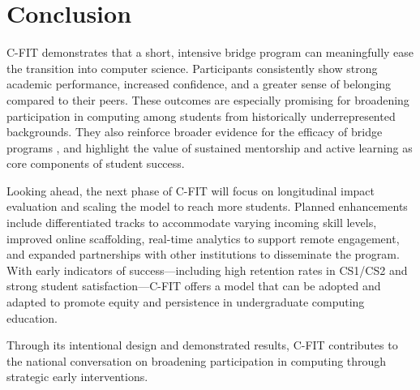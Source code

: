 \documentclass{article}
\begin{document}
\section{Conclusion}

C-FIT demonstrates that a short, intensive bridge program can meaningfully ease the transition into computer science. Participants consistently show strong academic performance, increased confidence, and a greater sense of belonging compared to their peers. These outcomes are especially promising for broadening participation in computing among students from historically underrepresented backgrounds. They also reinforce broader evidence for the efficacy of bridge programs \cite{bradford2021}, and highlight the value of sustained mentorship and active learning as core components of student success.

Looking ahead, the next phase of C-FIT will focus on longitudinal impact evaluation and scaling the model to reach more students. Planned enhancements include differentiated tracks to accommodate varying incoming skill levels, improved online scaffolding, real-time analytics to support remote engagement, and expanded partnerships with other institutions to disseminate the program. With early indicators of success—including high retention rates in CS1/CS2 and strong student satisfaction—C-FIT offers a model that can be adopted and adapted to promote equity and persistence in undergraduate computing education.

Through its intentional design and demonstrated results, C-FIT contributes to the national conversation on broadening participation in computing through strategic early interventions.


\printbibliography
\end{document}
